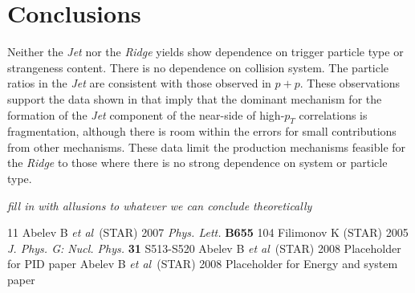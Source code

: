 \documentclass[twocolumn,showpacs,preprintnumbers,amsmath,amssymb,letterpaper]{revtex4}
\newcommand{\sNNtwohundred}{$\sqrt{s_{NN}}$ = $200$ $GeV$\xspace}
\newcommand{\sNNsixtytwo}{$\sqrt{s_{NN}}$ = $62$ $GeV$\xspace}
\newcommand{\sNN}{$\sqrt{s_{NN}}$\xspace}
\newcommand{\npart}{$N_{part}$\xspace}
\newcommand{\pT}{$p_T$\xspace}
\newcommand{\highpT}{high-\pT}
\newcommand{\jet}{\textit{Jet}\xspace}
\newcommand{\ridge}{\textit{Ridge}\xspace}
\newcommand{\pp}{$p+p$\xspace}
\newcommand{\Cu}{$Cu+Cu$\xspace}
\newcommand{\Au}{$Au+Au$\xspace}
\newcommand{\nearside}{near-side\xspace}
\newcommand{\JPG}{{\it J. Phys. G: Nucl. Phys.} }
\newcommand{\PL}{{\it Phys. Lett.} }
\newcommand{\etal}{{\it et al\/}\ }
\begin{document}
\section{Conclusions}
Neither the \jet nor the \ridge yields show dependence on trigger particle type or strangeness content.  There is no dependence on collision system.  The particle ratios in the \jet are consistent with those observed in \pp.  These observations support the data shown in \cite{PIDPaper,EnergyPaper} that imply that the dominant mechanism for the formation of the \jet component of the \nearside of \highpT correlations is fragmentation, although there is room within the errors for small contributions from other mechanisms.  These data limit the production mechanisms feasible for the \ridge to those where there is no strong dependence on system or particle type.

\textit{fill in with allusions to whatever we can conclude theoretically}



\begin{thebibliography}{11}
  Abelev B \etal (STAR) 2007 {\it \PL} {\bf B655} 104
  Filimonov K (STAR) 2005 {\it \JPG} {\bf 31} S513-S520
 Abelev B \etal (STAR) 2008 Placeholder for PID paper
 Abelev B \etal (STAR) 2008 Placeholder for Energy and system paper

\end{thebibliography}
\end{document}
